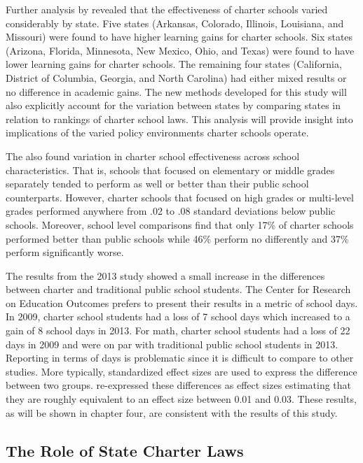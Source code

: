 \documentclass[letterpaper,12p,twoside]{article} %
\begin{document}
Further analysis by  revealed that the effectiveness of charter schools varied considerably by state. Five states (Arkansas, Colorado, Illinois, Louisiana, and Missouri) were found to have higher learning gains for charter schools. Six states (Arizona, Florida, Minnesota, New Mexico, Ohio, and Texas) were found to have lower learning gains for charter schools. The remaining four states (California, District of Columbia, Georgia, and North Carolina) had either mixed results or no difference in academic gains. The new methods developed for this study will also explicitly account for the variation between states by comparing states in relation to rankings of charter school laws. This analysis will provide insight into implications of the varied policy environments charter schools operate.

The  also found variation in charter school effectiveness across school characteristics. That is, schools that focused on elementary or middle grades separately tended to perform as well or better than their public school counterparts. However, charter schools that focused on high grades or multi-level grades performed anywhere from .02 to .08 standard deviations below public schools. Moreover, school level comparisons find that only 17\% of charter schools performed better than public schools while 46\% perform no differently and 37\% perform significantly worse.

The results from the 2013 study \cite{credo2013} showed a small increase in the differences between charter and traditional public school students. The Center for Research on Education Outcomes prefers to present their results in a metric of school days. In 2009, charter school students had a loss of 7 school days which increased to a gain of 8 school days in 2013. For math, charter school students had a loss of 22 days in 2009 and were on par with traditional public school students in 2013. Reporting in terms of days is problematic since it is difficult to compare to other studies. More typically, standardized effect sizes are used to express the difference between two groups.  re-expressed these differences as effect sizes estimating that they are roughly equivalent to an effect size between 0.01 and 0.03. These results, as will be shown in chapter four, are consistent with the results of this study. 

\subsection{The Role of State Charter Laws}
\end{document}

